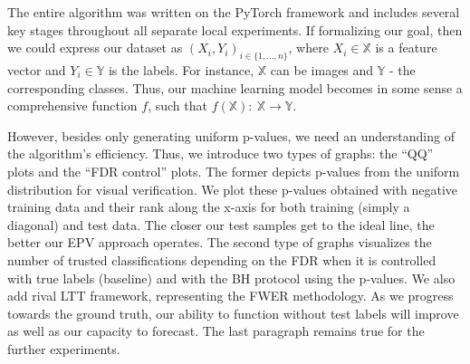 \documentclass{article}
\begin{document}
The entire algorithm was written on the PyTorch framework and includes several key stages throughout all separate local experiments. If formalizing our goal, then we could express our dataset as $(X_i, Y_i)_{i\in\{1, ..., n\}}$, where $X_i \in \mathbb{X}$ is a feature vector and  $Y_i \in \mathbb{Y}$ is the labels. For instance, $\mathbb{X}$ can be images and $\mathbb{Y}$ - the corresponding classes. Thus, our machine learning model becomes in some sense a comprehensive function $f$, such that $f(\mathbb{X}): \  \mathbb{X} \rightarrow \mathbb{Y}$.

However, besides only generating uniform p-values, we need an understanding of the algorithm’s efficiency. Thus, we introduce two types of graphs: the “QQ” plots and the “FDR control” plots. The former depicts p-values from the uniform distribution for visual verification. We plot these p-values obtained with negative training data and their rank along the x-axis for both training (simply a diagonal) and test data. The closer our test samples get to the ideal line, the better our EPV approach operates. The second type of graphs visualizes the number of trusted classifications depending on the FDR when it is controlled with true labels (baseline) and with the BH protocol using the p-values. We also add rival LTT framework, representing the FWER methodology. As we progress towards the ground truth, our ability to function without test labels will improve as well as our capacity to forecast. The last paragraph remains true for the further experiments.
\end{document}
